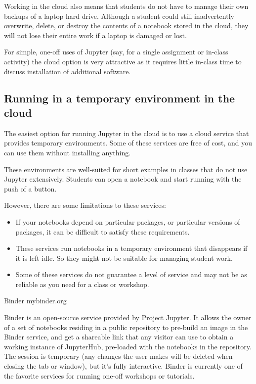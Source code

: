 \documentclass[]{book}
\let\BeginKnitrBlock\begin \let\EndKnitrBlock\end
\begin{document}
Working in the cloud also means that students do not have to manage
their own backups of a laptop hard drive. Although a student could still
inadvertently overwrite, delete, or destroy the contents of a notebook
stored in the cloud, they will not lose their entire work if a laptop is
damaged or lost.

For simple, one-off uses of Jupyter (say, for a single assignment or
in-class activity) the cloud option is very attractive as it requires
little in-class time to discuss installation of additional software.

\subsection{Running in a temporary environment in the
cloud}\label{running-in-a-temporary-environment-in-the-cloud}

The easiest option for running Jupyter in the cloud is to use a cloud
service that provides temporary environments. Some of these services are
free of cost, and you can use them without installing anything.

These environments are well-suited for short examples in classes that do
not use Jupyter extensively. Students can open a notebook and start
running with the push of a button.

However, there are some limitations to these services:

\begin{itemize}
\item
  If your notebooks depend on particular packages, or particular
  versions of packages, it can be difficult to satisfy these
  requirements.
\item
  These services run notebooks in a temporary environment that
  disappears if it is left idle. So they might not be suitable for
  managing student work.
\item
  Some of these services do not guarantee a level of service and may not
  be as reliable as you need for a class or workshop.
\end{itemize}

\BeginKnitrBlock{rmdnote}
Binder mybinder.org

Binder is an open-source service provided by Project Jupyter. It allows
the owner of a set of notebooks residing in a public repository to
pre-build an image in the Binder service, and get a shareable link that
any visitor can use to obtain a working instance of JupyterHub,
pre-loaded with the notebooks in the repository. The session is
temporary (any changes the user makes will be deleted when closing the
tab or window), but it's fully interactive. Binder is currently one of
the favorite services for running one-off workshops or tutorials.
\EndKnitrBlock{rmdnote}
\end{document}
